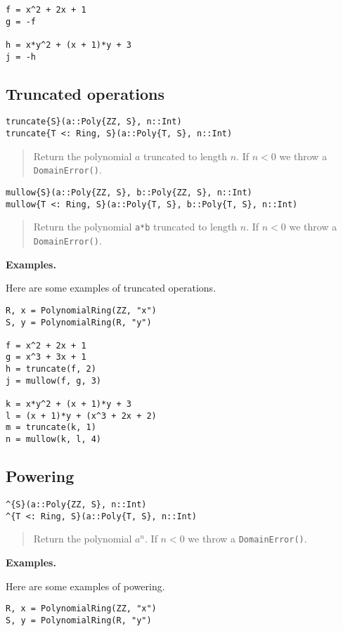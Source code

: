 \documentclass[a4paper,10pt]{article}
\newcommand{\code}{\lstinline}
\newcommand{\desc}[1]{\vspace{-3mm}\begin{quote}#1\end{quote}}
\begin{document}
{{{{{{\begin{lstlisting}
f = x^2 + 2x + 1
g = -f

h = x*y^2 + (x + 1)*y + 3
j = -h
\end{lstlisting}

\subsection{Truncated operations}

\begin{lstlisting}
truncate{S}(a::Poly{ZZ, S}, n::Int)
truncate{T <: Ring, S}(a::Poly{T, S}, n::Int)
\end{lstlisting}

\desc{Return the polynomial $a$ truncated to length $n$. If $n < 0$ we throw a
\code{DomainError()}.}

\begin{lstlisting}
mullow{S}(a::Poly{ZZ, S}, b::Poly{ZZ, S}, n::Int)
mullow{T <: Ring, S}(a::Poly{T, S}, b::Poly{T, S}, n::Int)
\end{lstlisting}

\desc{Return the polynomial \code{a*b} truncated to length $n$. If $n < 0$ we
throw a \code{DomainError()}.}

\textbf{Examples.}

Here are some examples of truncated operations.

\begin{lstlisting}
R, x = PolynomialRing(ZZ, "x")
S, y = PolynomialRing(R, "y")

f = x^2 + 2x + 1
g = x^3 + 3x + 1
h = truncate(f, 2)
j = mullow(f, g, 3)

k = x*y^2 + (x + 1)*y + 3
l = (x + 1)*y + (x^3 + 2x + 2)
m = truncate(k, 1)
n = mullow(k, l, 4)
\end{lstlisting}

\subsection{Powering}

\begin{lstlisting}
^{S}(a::Poly{ZZ, S}, n::Int)
^{T <: Ring, S}(a::Poly{T, S}, n::Int)
\end{lstlisting}

\desc{Return the polynomial $a^n$. If $n < 0$ we throw a \code{DomainError()}.}

\textbf{Examples.}

Here are some examples of powering.

\begin{lstlisting}
R, x = PolynomialRing(ZZ, "x")
S, y = PolynomialRing(R, "y")


\end{lstlisting}}}}}}}
\end{document}
